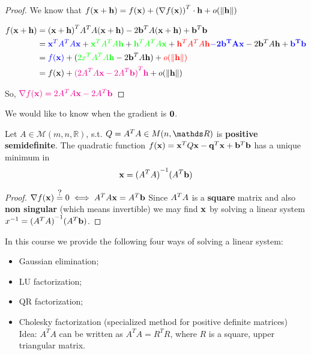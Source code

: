 \documentclass[computationalMathematics.tex]{subfiles}
\begin{document}
\begin{proof}
	We know that $f({\bf x } + {\bf h }) = f({\bf x }) + {(\nabla f({\bf x }))}^{T} \cdot {\bf h } + o(\left\lVert{\bf h }\right\rVert)$
	
	\begin{equation}
		\begin{split}
			f({\bf x }+{\bf h }) & = {({\bf x }+{\bf h })}^{T} {A}^{T}A({\bf x }+{\bf h }) - 2{{\bf b }}^{T}A({\bf x }+{\bf h }) + {{\bf b }}^{T}{\bf b }\\
			& = {\color{blue} {{\bf x }}^{T} {A}^{T}A{\bf x }} + {\color{green} {{\bf x }}^{T}{A}^{T}A{\bf h }} + {\color{green} {{\bf h }}^{T} {A}^{T} A {\bf x }} + {\color{red} {{\bf h }}^{T} {A}^{T} A {\bf h }} {\bf \color{blue}- 2 {{\bf b }}^{T} A {\bf x }} - 2 {{\bf b }}^{T} A {\bf h } + {\bf \color{blue} {{\bf b }}^{T} {\bf b }}\\
			& = {\color{blue}f({\bf x })} +({\color{green} 2 {x}^{T} {A}^{T} A {\bf h }}- 2 {{\bf b }}^{T} A {\bf h }) + {\color{red} o(\left\lVert{\bf h }\right\rVert)}\\
			& = f({\bf x }) + { \color{magenta} {(2 {A}^{T} A {\bf x } - 2 {A}^{T} {\bf b })}^{T}{\bf h }} + o(\left\lVert{\bf h }\right\rVert) 
		\end{split}
	\end{equation}
	
	So, ${\color{magenta} \nabla  f({\bf x }) = 2 {A}^{T} A {\bf x } - 2{A}^{T} {\bf b }}$	
\end{proof}

\noindent We would like to know when the gradient is ${\bf 0 }$.

\begin{proposition}
	Let $A \in \mathcal{M}(m, n, \mathds{R})$, s.t. $Q = \tr{A} A \in M(n, \R)$ is \textbf{positive semidefinite}.
	The quadratic function $f({\bf x }) = {{\bf x }}^{T}Q{\bf x } -{{\bf q }}^{T}{\bf x } +{{\bf b }}^{T}{\bf b }$ has a unique minimum in
	\[
		{\bf x } = {({A}^{T} A)}^{-1} ({A}^{T}{\bf b })
	\]
\end{proposition}

\begin{proof}
	$\nabla  f(\vect{x}) \questeq 0 \iff \tr{A} A \vect{x} = \tr{A} \vect{b}$
	Since ${A}^{T} A$ is a {\bf square} matrix and also {\bf non singular} (which means invertible) we may find ${\bf x }$ by solving a linear system ${x}^{-1} = {({A}^{T} A)}^{-1}({A}^{T} {\bf b })$.
\end{proof}

\noindent In this course we provide the following four ways of solving a linear system:
\begin{itemize}
  \item Gaussian elimination;
  \item LU factorization;
  \item QR factorization;
  \item Cholesky factorization (specialized method for positive definite matrices)
    Idea: ${A}^{T}A$ can be written as ${A}^{T}A={R}^{T}R$, where $R$ is a square, upper triangular matrix.
\end{itemize}
\end{document}
